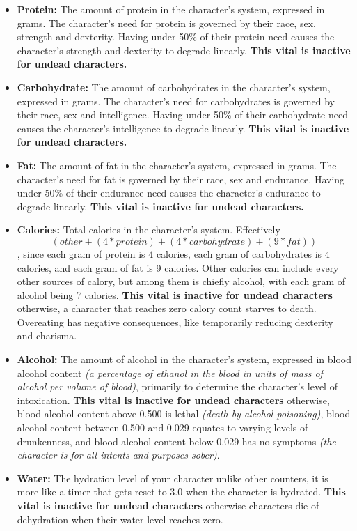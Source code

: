 \documentclass[openany,11pt,a4paper]{book}
\begin{document}
\begin{itemize}
\item \textbf{Protein:} The amount of protein in the character's system, expressed in grams. The character's need for protein is governed by their race, sex, strength and dexterity. Having under 50\% of their protein need causes the character's strength and dexterity to degrade linearly. \textbf{This vital is inactive for undead characters.}
\item \textbf{Carbohydrate:} The amount of carbohydrates in the character's system, expressed in grams. The character's need for carbohydrates is governed by their race, sex and intelligence. Having under 50\% of their carbohydrate need causes the character's intelligence to degrade linearly. \textbf{This vital is inactive for undead characters.}
\item \textbf{Fat:} The amount of fat in the character's system, expressed in grams. The character's need for fat is governed by their race, sex and endurance. Having under 50\% of their endurance need causes the character's endurance to degrade linearly. \textbf{This vital is inactive for undead characters.}
\item \textbf{Calories:} Total calories in the character's system. Effectively \[(other+(4*protein)+(4*carbohydrate)+(9*fat))\], since each gram of protein is 4 calories, each gram of carbohydrates is 4 calories, and each gram of fat is 9 calories. Other calories can include every other sources of calory, but among them is chiefly alcohol, with each gram of alcohol being 7 calories. \textbf{This vital is inactive for undead characters} \textemdash otherwise, a character that reaches zero calory count starves to death. Overeating has negative consequences, like temporarily reducing dexterity and charisma.
\item \textbf{Alcohol:} The amount of alcohol in the character's system, expressed in blood alcohol content \textit{(a percentage of ethanol in the blood in units of mass of alcohol per volume of blood)}, primarily to determine the character's level of intoxication. \textbf{This vital is inactive for undead characters} \textemdash otherwise, blood alcohol content above 0.500 is lethal \textit{(death by alcohol poisoning)}, blood alcohol content between 0.500 and 0.029 equates to varying levels of drunkenness, and blood alcohol content below 0.029 has no symptoms \textit{(the character is for all intents and purposes sober)}.
\item \textbf{Water:} The hydration level of your character \textemdash unlike other counters, it is more like a timer that gets reset to 3.0 when the character is hydrated. \textbf{This vital is inactive for undead characters} \textemdash otherwise characters die of dehydration when their water level reaches zero.

\end{itemize}
\end{document}
